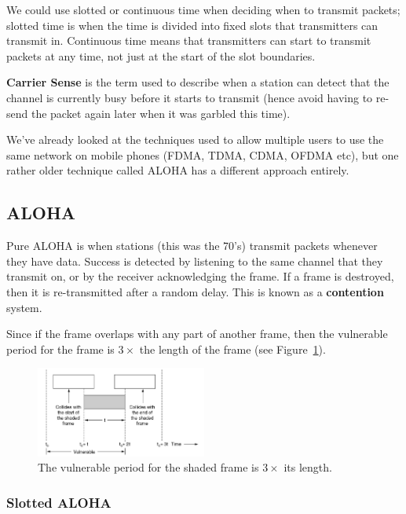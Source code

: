 We could use slotted or continuous time when deciding when to transmit packets;
slotted time is when the time is divided into fixed slots that transmitters can
transmit in. Continuous time means that transmitters can start to transmit
packets at any time, not just at the start of the slot boundaries.

\textbf{Carrier Sense} is the term used to describe when a station can detect
that the channel is currently busy before it starts to transmit (hence avoid
having to re-send the packet again later when it was garbled this time).

We've already looked at the techniques used to allow multiple users to use the
same network on mobile phones (FDMA, TDMA, CDMA, OFDMA etc), but one rather
older technique called ALOHA has a different approach entirely.

\subsection{ALOHA}

Pure ALOHA is when stations (this was the 70's) transmit packets whenever they
have data. Success is detected by listening to the same channel that they
transmit on, or by the receiver acknowledging the frame. If a frame is
destroyed, then it is re-transmitted after a random delay. 
This is known as a \textbf{contention} system.

Since if the frame overlaps with any part of another frame, then the vulnerable
period for the frame is $3\times$ the length of the frame (see
Figure~\ref{aloha-vun}).

\begin{figure}[ht]
  \centering
  \includegraphics[width=0.5\textwidth]{images/aloha-vun}
  \caption{The vulnerable period for the shaded frame is $3\times$ its length.}
  \label{aloha-vun}
\end{figure}

\subsubsection{Slotted ALOHA}


